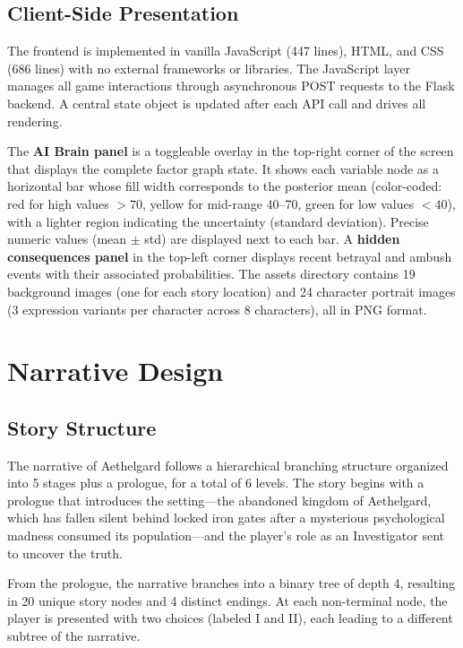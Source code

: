 \documentclass[journal]{IEEEtran}
\begin{document}
\subsection{Client-Side Presentation}

The frontend is implemented in vanilla JavaScript (447 lines), HTML, and CSS (686 lines) with no external frameworks or libraries. The JavaScript layer manages all game interactions through asynchronous POST requests to the Flask backend. A central state object is updated after each API call and drives all rendering.

The \textbf{AI Brain panel} is a toggleable overlay in the top-right corner of the screen that displays the complete factor graph state. It shows each variable node as a horizontal bar whose fill width corresponds to the posterior mean (color-coded: red for high values $>70$, yellow for mid-range 40--70, green for low values $<40$), with a lighter region indicating the uncertainty (standard deviation). Precise numeric values (mean $\pm$ std) are displayed next to each bar. A \textbf{hidden consequences panel} in the top-left corner displays recent betrayal and ambush events with their associated probabilities. The assets directory contains 19 background images (one for each story location) and 24 character portrait images (3 expression variants per character across 8 characters), all in PNG format.


\section{Narrative Design}

\subsection{Story Structure}

The narrative of Aethelgard follows a hierarchical branching structure organized into 5 stages plus a prologue, for a total of 6 levels. The story begins with a prologue that introduces the setting---the abandoned kingdom of Aethelgard, which has fallen silent behind locked iron gates after a mysterious psychological madness consumed its population---and the player's role as an Investigator sent to uncover the truth.

From the prologue, the narrative branches into a binary tree of depth 4, resulting in 20 unique story nodes and 4 distinct endings. At each non-terminal node, the player is presented with two choices (labeled I and II), each leading to a different subtree of the narrative.
\end{document}

